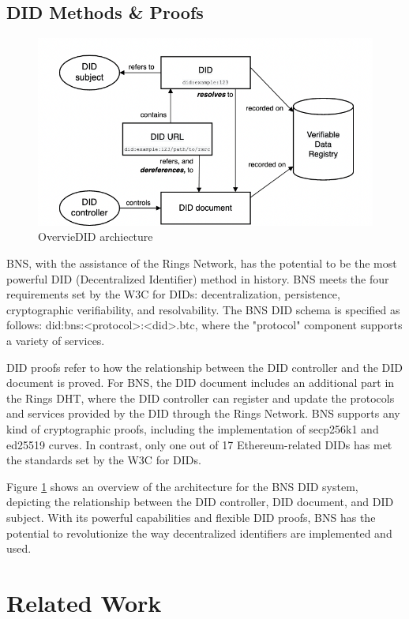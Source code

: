 \documentclass[twocolumn]{article}
\begin{document}
\subsection{DID Methods \& Proofs}
\begin{figure}[H]
  \label{arch}
  \includegraphics[width=\linewidth]{imgs/arch.png}
  \caption{OvervieDID archiecture}
\end{figure}


BNS, with the assistance of the Rings Network, has the potential to be the most powerful DID (Decentralized Identifier) method in history. BNS meets the four requirements set by the W3C for DIDs: decentralization, persistence, cryptographic verifiability, and resolvability. The BNS DID schema is specified as follows: did:bns:<protocol>:<did>.btc, where the "protocol" component supports a variety of services.

DID proofs refer to how the relationship between the DID controller and the DID document is proved. For BNS, the DID document includes an additional part in the Rings DHT, where the DID controller can register and update the protocols and services provided by the DID through the Rings Network. BNS supports any kind of cryptographic proofs, including the implementation of secp256k1 and ed25519 curves. In contrast, only one out of 17 Ethereum-related DIDs has met the standards set by the W3C for DIDs.

Figure \ref{arch} shows an overview of the architecture for the BNS DID system, depicting the relationship between the DID controller, DID document, and DID subject. With its powerful capabilities and flexible DID proofs, BNS has the potential to revolutionize the way decentralized identifiers are implemented and used.

\section{Related Work}
\end{document}
